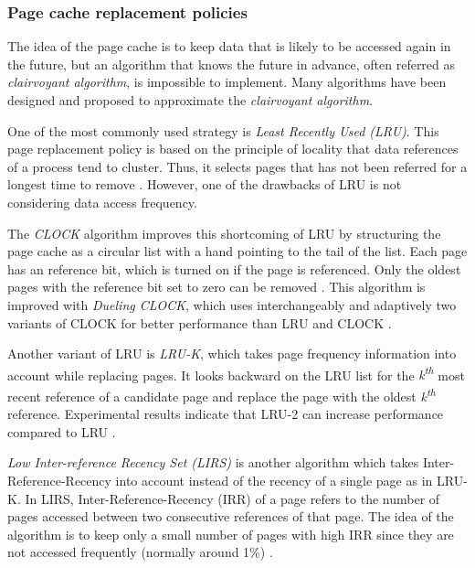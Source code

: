 \subsubsection{Page cache replacement policies}

The idea of the page cache is to keep data that is likely to be accessed again 
in the future, but an algorithm that knows the future in advance, often 
referred as \textit{clairvoyant algorithm}, is impossible to implement. 
Many algorithms have been designed and proposed to approximate the 
\textit{clairvoyant algorithm}. 

One of the most commonly used strategy is \textit{Least Recently Used (LRU)}. 
This page replacement policy is based on the principle of locality that 
data references of a process tend to cluster. Thus, it selects pages that 
has not been referred for a longest time to remove 
\cite{chavan2011comparison}. However, one of the drawbacks of LRU 
is not considering data access frequency.

The \textit{CLOCK} algorithm improves this shortcoming of LRU by 
structuring the page cache as a circular list with a hand pointing to 
the tail of the list.
Each page has an reference bit, which is turned on if the page is referenced. 
Only the oldest pages with the reference bit set to zero can be removed 
\cite{chavan2011comparison}. 
This algorithm is improved with \textit{Dueling CLOCK}, which uses 
interchangeably and adaptively two variants of CLOCK for better 
performance than LRU and CLOCK \cite{chavan2011comparison}.

Another variant of LRU is \textit{LRU-K}, which takes page frequency 
information  into account while replacing pages. It looks backward on the 
LRU list for the \textit{k\textsuperscript{th}} most recent reference of 
a candidate page and replace the page with the oldest 
\textit{k\textsuperscript{th}} reference. 
Experimental results indicate that LRU-2 can increase performance 
compared to LRU \cite{chavan2011comparison}. 

\textit{Low Inter-reference Recency Set (LIRS)} is another algorithm 
which takes Inter-Reference-Recency into account instead of the recency 
of a single page as in LRU-K. 
In LIRS, Inter-Reference-Recency (IRR) of a page refers to the 
number of pages accessed between two consecutive references of that page. 
The idea of the algorithm is to keep only a small number of pages with 
high IRR since they are not accessed frequently (normally around 1\%) 
\cite{chavan2011comparison}. 

